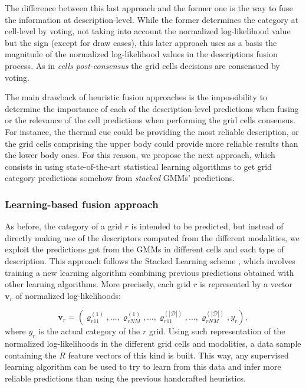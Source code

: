 \documentclass[10pt,twocolumn,letterpaper]{article}
\begin{document}
The difference between this last approach and the former one is the way to fuse the information at description-level. While the former determines the category at cell-level by voting, not taking into account the normalized log-likelihood value but the sign (except for draw cases), this later approach uses as a basis the magnitude of the normalized log-likelihood values in the descriptions fusion process. As in \textit{cells post-consensus} the grid cells decisions are consensued by voting.

The main drawback of heuristic fusion approaches is the impossibility to determine the importance of each of the description-level predictions when fusing or the relevance of the cell predictions when performing the grid cells consensus. For instance, the thermal cue could be providing the most reliable description, or the grid cells comprising the upper body could provide more reliable results than the lower body ones. For this reason, we propose the next approach, which consists in using state-of-the-art statistical learning algorithms to get grid category predictions somehow from \textit{stacked} GMMs' predictions.

\subsubsection{Learning-based fusion approach}

As before, the category of a grid $r$ is intended to be predicted, but instead of directly making use of the descriptors computed from the different modalities, we exploit the predictions got from the GMMs in different cells and each type of description. This approach follows the Stacked Learning scheme \cite{cohen2005stacked, puertas2013generalized}, which involves training a new learning algorithm combining previous predictions obtained with other learning algorithms. More precisely, each grid $r$ is represented by a vector $\mathbf{v}_r$ of normalized log-likelihoods:

$$\mathbf{v}_r = (\varrho_{r11}^{(1)}, ..., \varrho_{rNM}^{(1)}, ..., \varrho_{r11}^{(|\mathcal{D}|)}, ..., \varrho_{rNM}^{(|\mathcal{D}|)}, y_r) ,$$
where $y_r$ is the actual category of the $r$ grid. Using such representation of the normalized log-likelihoods in the different grid cells and modalities, a data sample containing the $R$ feature vectors of this kind is built. This way, any supervised learning algorithm can be used to try to learn from this data and infer more reliable predictions than using the previous handcrafted heuristics. 
\end{document}
